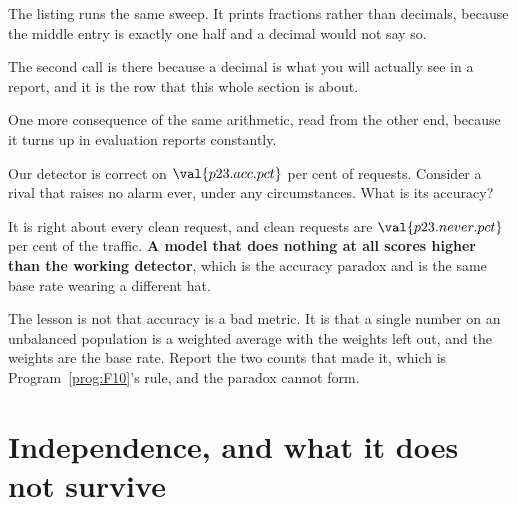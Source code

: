 \begin{fr}
The listing runs the same sweep. It prints fractions rather than decimals,
because the middle entry is exactly one half and a decimal would not say so.


The second call is there because a decimal is what you will actually see in a
report, and it is the row that this whole section is about.
\end{fr}

\begin{fr}
One more consequence of the same arithmetic, read from the other end, because
it turns up in evaluation reports constantly.

Our detector is correct on $\val{p23.acc.pct}$ per cent of requests. Consider a
rival that raises no alarm ever, under any circumstances. What is its accuracy?
\dotline
\nextframe
\end{fr}

\begin{fr}

It is right about every clean request, and clean requests are
$\val{p23.never.pct}$ per cent of the traffic. \textbf{A model that does
nothing at all scores higher than the working detector}, which is the accuracy
paradox and is the same base rate wearing a different hat.

\begin{warning}
The lesson is not that accuracy is a bad metric. It is that a single number on
an unbalanced population is a weighted average with the weights left out, and
the weights are the base rate. Report the two counts that made it, which is
Program~\ref{prog:F10}'s rule, and the paradox cannot form.
\end{warning}
\end{fr}

\section{Independence, and what it does not survive}
\label{sec:P23-independence}

